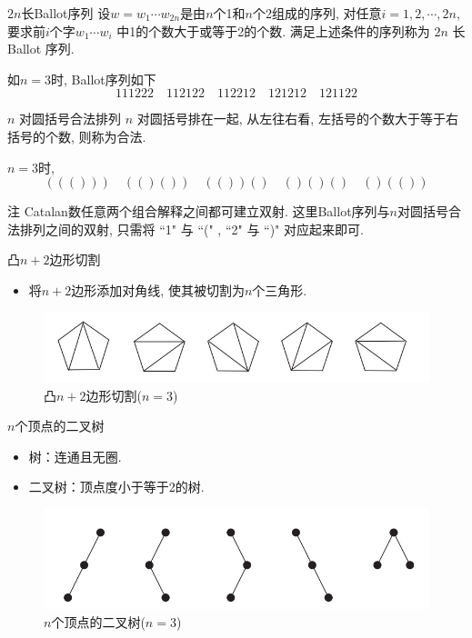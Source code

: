 \documentclass[punct]{beamer}
\begin{document}
\begin{frame}{$2n$长Ballot序列}
    设$w=w_{1}\cdots w_{2n}$是由$n$个1和$n$个2组成的序列, 对任意$i=1,2,\cdots, 2n$,  要求前$i$个字$w_{1}\cdots w_{i}$ 中1的个数大于或等于2的个数. 满足上述条件的序列称为 $2n$ 长 Ballot 序列.

    如$n=3$时, Ballot序列如下
    \[
    111222\quad 112122\quad 112212\quad 121212\quad 121122
    \]
\end{frame}
\begin{frame}{$n$ 对圆括号合法排列}
    $n$ 对圆括号排在一起, 从左往右看, 左括号的个数大于等于右括号的个数, 则称为合法.

    $n=3$时,
    \[
    ((()))\quad (()())\quad (())()\quad ()()()\quad ()(())
    \]
    \begin{block}{注}
        Catalan数任意两个组合解释之间都可建立双射. 这里Ballot序列与$n$对圆括号合法排列之间的双射, 只需将 ``1" 与 ``(" , ``2" 与 ``)" 对应起来即可.
    \end{block}
\end{frame}




\begin{frame}{凸$n+2$边形切割}
	\begin{itemize}
		\item 将$n+2$边形添加对角线, 使其被切割为$n$个三角形.
	\end{itemize}
	\begin{figure}[h]
		\centering
		\includegraphics[width=0.8\linewidth]{Triangulated-polygons.jpg}
		\caption{凸$n+2$边形切割($n=3$)}
	\end{figure}
\end{frame}

\begin{frame}{$n$个顶点的二叉树}
	\begin{itemize}
		\item 树：连通且无圈.
		\item 二叉树：顶点度小于等于2的树.
	\end{itemize}
	\begin{figure}[h]
		\centering
		\includegraphics[width=0.8\linewidth]{binary-trees.jpg}
		\caption{$n$个顶点的二叉树($n=3$)}
	\end{figure}
\end{frame}
\end{document}
